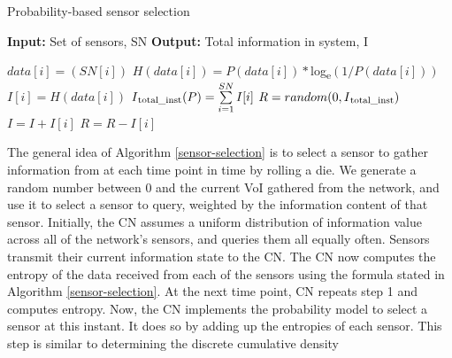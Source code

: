 \begin{algorithm}
  \caption{Probability-based sensor selection}
  \label{sensor-selection}
  \textbf{Input:} Set of sensors, SN \newline
  \textbf{Output:} Total information in system, I
  
  \begin{spacing}{0.8}
  \begin{algorithmic}[1]
    \State $data[i] = (SN[i])$
    \State $H (data[i]) =  P(data[i]) * $log\textsubscript{e}$ (1/P(data[i]))$
    \State $I[i] = H(data[i])$
    \EndFor
    \State $I\textsubscript{total\_inst}(P)  = \sum\limits_{i=1}^{SN} I[i]$
    \State $R = random (0, I\textsubscript{total\_inst})$
    \State $I = I + I[i]$
    \Else
    \State $R = R - I[i]$
    \EndIf
    \EndFor
  \end{algorithmic}
  \end{spacing}
\end{algorithm}
The general idea of Algorithm \ref{sensor-selection} is to select a
sensor to gather information from at each time point in time by
rolling a die. We generate a random number between 0 and the current
VoI gathered from the network, and use it to select a sensor to query,
weighted by the information content of that sensor. Initially, the CN
assumes a uniform distribution of information value across all of the
network's sensors, and queries them all equally often. Sensors
transmit their current information state to the CN.  The CN now
computes the entropy of the data received from each of the sensors
using the formula stated in Algorithm \ref{sensor-selection}.  At the
next time point, CN repeats step 1 and computes entropy. Now, the CN
implements the probability model to select a sensor at this
instant. It does so by adding up the entropies of each sensor. This
step is similar to determining the discrete cumulative density
